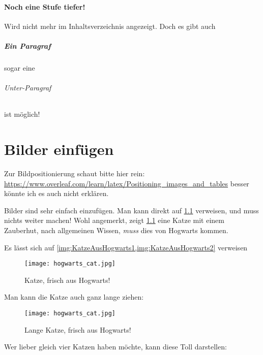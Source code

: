 \subsubsection{Noch eine Stufe tiefer!}
Wird nicht mehr im Inhaltsverzeichnis angezeigt.
Doch es gibt auch
\paragraph{Ein Paragraf} sogar eine
\subparagraph{Unter-Paragraf} ist möglich!


\chapter{Bilder einfügen}

Zur Bildpositionierung schaut bitte hier rein: \url{https://www.overleaf.com/learn/latex/Positioning_images_and_tables} besser könnte ich es auch nicht erklären.

Bilder sind sehr einfach einzufügen.
Man kann direkt auf \cref{img:KatzeAusHogwarts1} verweisen, und muss nichts weiter machen!
Wohl angemerkt, zeigt \cref{img:KatzeAusHogwarts1} eine Katze mit einem Zauberhut, nach allgemeinen Wissen, \textit{muss} dies von Hogwarts kommen.

Es lässt sich auf \cref{img:KatzeAusHogwarts1,img:KatzeAusHogwarts2} verweisen

\begin{figure}[H]
    \texttt{[image: hogwarts\_cat.jpg]}
    \centering
    \vspace{-5pt}
    \caption{Katze, frisch aus Hogwarts!}
    \label{img:KatzeAusHogwarts1}
\end{figure}

Man kann die Katze auch ganz lange ziehen:

\begin{figure}[H]
    \texttt{[image: hogwarts\_cat.jpg]}
    \centering
    \vspace{-5pt}
    \caption{Lange Katze, frisch aus Hogwarts!}
    \label{img:KatzeAusHogwarts2}
\end{figure}

Wer lieber gleich vier Katzen haben möchte, kann diese Toll darstellen:

